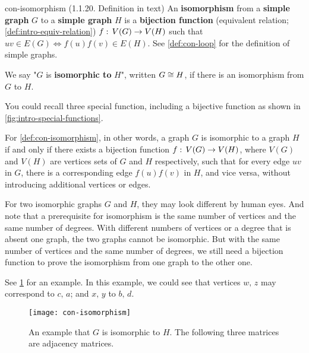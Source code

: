 \documentclass[../src/handouts/main.tex]{subfiles}
\begin{document}
\begin{definition}{}{con-isomorphism}
  (1.1.20. Definition in text)
  An \textbf{isomorphism} from a \textbf{simple graph} $G$ to a \textbf{simple graph} $H$ is a \textbf{bijection function} (equivalent relation; \cref{def:intro-equiv-relation}) $f:\, V(G) \to V(H)$ such that $uv \in E(G) \iff f(u)f(v) \in E(H)$. See \cref{def:con-loop} for the definition of simple graphs.

  We say "$G$ is \textbf{isomorphic to} $H$", written $G \cong H$, if there is an isomorphism from $G$ to $H$.
\end{definition}

You could recall three special function, including a bijective function as shown in \cref{fig:intro-special-functions}.

For \cref{def:con-isomorphism}, in other words, a graph $G$ is isomorphic to a graph $H$ if and only if there exists a bijection function $f:\, V(G) \to V(H)$, where $V(G)$ and $V(H)$ are vertices sets of $G$ and $H$ respectively, such that for every edge $uv$ in $G$, there is a corresponding edge $f(u)f(v)$ in $H$, and vice versa, without introducing additional vertices or edges.

For two isomorphic graphs $G$ and $H$, they may look different by human eyes. And note that a prerequisite for isomorphism is the same number of vertices and the same number of degrees. With different numbers of vertices or a degree that is absent one graph, the two graphs cannot be isomorphic. But with the same number of vertices and the same number of degrees, we still need a bijection function to prove the isomorphism from one graph to the other one.

See \cref{fig:con-isomorphism} for an example. In this example, we could see that vertices $w,\, z$ may correspond to $c,\, a$; and $x,\, y$ to $b,\, d$.

\begin{figure}[ht]
  \centering
  \texttt{[image: con-isomorphism]}
  \caption{An example that $G$ is isomorphic to $H$. The following three matrices are adjacency matrices.}
  \label{fig:con-isomorphism}
\end{figure}
\end{document}
